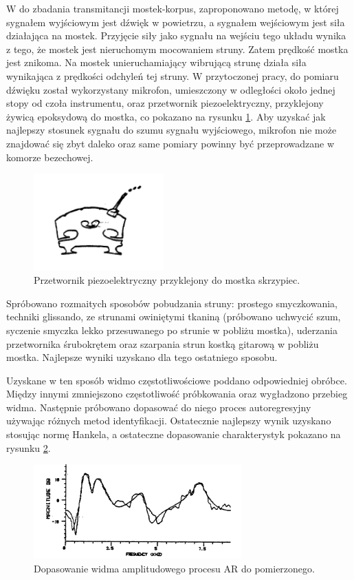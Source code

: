 W \cite{bowed_smith} do zbadania transmitancji mostek-korpus, zaproponowano metodę, w której sygnałem wyjściowym jest dźwięk w powietrzu, a sygnałem wejściowym jest siła działająca na mostek. Przyjęcie siły jako sygnału na wejściu tego układu wynika z tego, że mostek jest nieruchomym mocowaniem struny. Zatem prędkość mostka jest znikoma. Na mostek unieruchamiający wibrującą strunę działa siła wynikająca z prędkości odchyleń tej struny. W przytoczonej pracy, do pomiaru dźwięku został wykorzystany mikrofon, umieszczony w odległości około jednej stopy od czoła instrumentu, oraz przetwornik piezoelektryczny, przyklejony żywicą epoksydową do mostka, co pokazano na rysunku \ref{rys:pomiary}. Aby uzyskać jak najlepszy stosunek sygnału do szumu sygnału wyjściowego, mikrofon nie może znajdować się zbyt daleko oraz same pomiary powinny być przeprowadzane w komorze bezechowej.

\begin{figure}[H]
	\centering
	\includegraphics[width=5cm]{grafiki/pomiary}
	\captionsetup{justification=centering}
	\caption{Przetwornik piezoelektryczny przyklejony do mostka skrzypiec.}
	\label{rys:pomiary}
\end{figure}

Spróbowano rozmaitych sposobów pobudzania struny: prostego smyczkowania, techniki glissando, ze strunami owiniętymi tkaniną (próbowano uchwycić szum, syczenie smyczka lekko przesuwanego po strunie w pobliżu mostka), uderzania przetwornika śrubokrętem oraz szarpania strun kostką gitarową w pobliżu mostka. Najlepsze wyniki uzyskano dla tego ostatniego sposobu.

Uzyskane w ten sposób widmo częstotliwościowe poddano odpowiedniej obróbce. Między innymi zmniejszono częstotliwość próbkowania oraz wygładzono przebieg widma. Następnie próbowano dopasować do niego proces autoregresyjny używając różnych metod identyfikacji. Ostatecznie najlepszy wynik uzyskano stosując normę Hankela, a ostateczne dopasowanie charakterystyk pokazano na rysunku \ref{rys:hankel}.

\begin{figure}[H]
	\centering
	\includegraphics[width=8cm]{grafiki/hankel}
	\captionsetup{justification=centering}
	\caption{Dopasowanie widma amplitudowego procesu AR do pomierzonego.}
	\label{rys:hankel}
\end{figure}


